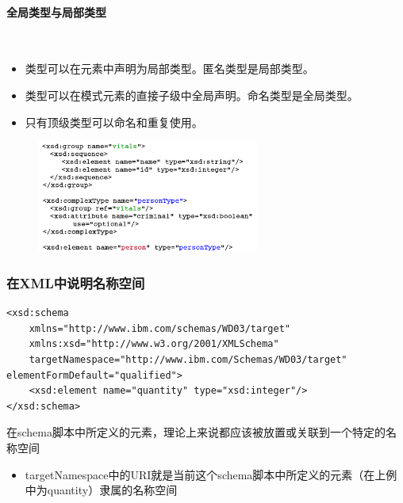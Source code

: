 \paragraph*{全局类型与局部类型}~{} \par
\begin{itemize}
	\item 类型可以在元素中声明为局部类型。匿名类型是局部类型。
	\item 类型可以在模式元素的直接子级中全局声明。命名类型是全局类型。
	\item 只有顶级类型可以命名和重复使用。
\end{itemize}

\begin{figure}[H]
    \vspace{-0.5em}
	\centering
	\includegraphics[width=0.65\textwidth]{images/全局声明.png}
    \vspace{-1em}
\end{figure}

\subsubsection{在XML中说明名称空间}
\begin{lstlisting}
<xsd:schema
	xmlns="http://www.ibm.com/schemas/WD03/target"
	xmlns:xsd="http://www.w3.org/2001/XMLSchema"
	targetNamespace="http://www.ibm.com/Schemas/WD03/target" elementFormDefault="qualified">
	<xsd:element name="quantity" type="xsd:integer"/>
</xsd:schema>
\end{lstlisting}
在schema脚本中所定义的元素，理论上来说都应该被放置或关联到一个特定的名称空间
\begin{itemize}
	\item targetNamespace中的URI就是当前这个schema脚本中所定义的元素（在上例中为quantity）隶属的名称空间
\end{itemize}


